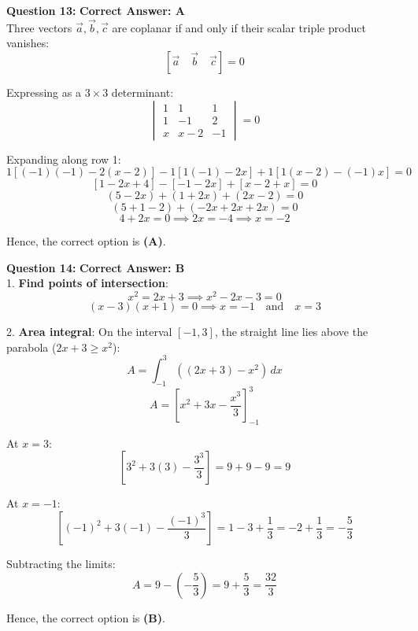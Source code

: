 \documentclass[11pt,a4paper]{article}
\begin{document}
\begin{tcolorbox}[solbox]
\textbf{\textcolor{primaryDark}{Question 13:}} \hfill \textbf{\textcolor{l1Green}{Correct Answer: A}}\\
\vspace{4pt}
Three vectors $\vec{a}, \vec{b}, \vec{c}$ are coplanar if and only if their scalar triple product vanishes:
$$[\vec{a} \quad \vec{b} \quad \vec{c}] = 0$$

Expressing as a $3 \times 3$ determinant:
$$\begin{vmatrix} 1 & 1 & 1 \\ 1 & -1 & 2 \\ x & x - 2 & -1 \end{vmatrix} = 0$$

Expanding along row 1:
$$1 [(-1)(-1) - 2(x - 2)] - 1 [1(-1) - 2x] + 1 [1(x - 2) - (-1)x] = 0$$
$$[1 - 2x + 4] - [-1 - 2x] + [x - 2 + x] = 0$$
$$(5 - 2x) + (1 + 2x) + (2x - 2) = 0$$
$$(5 + 1 - 2) + (-2x + 2x + 2x) = 0$$
$$4 + 2x = 0 \implies 2x = -4 \implies x = -2$$

Hence, the correct option is \textbf{(A)}.
\end{tcolorbox}

\begin{tcolorbox}[solbox]
\textbf{\textcolor{primaryDark}{Question 14:}} \hfill \textbf{\textcolor{l1Green}{Correct Answer: B}}\\
\vspace{4pt}
1. \textbf{Find points of intersection}:
$$x^2 = 2x + 3 \implies x^2 - 2x - 3 = 0$$
$$(x - 3)(x + 1) = 0 \implies x = -1 \quad \text{and} \quad x = 3$$

2. \textbf{Area integral}:
On the interval $[-1, 3]$, the straight line lies above the parabola ($2x + 3 \ge x^2$):
$$A = \int_{-1}^{3} \left( (2x + 3) - x^2 \right)\, dx$$
$$A = \left[ x^2 + 3x - \frac{x^3}{3} \right]_{-1}^{3}$$

At $x = 3$:
$$\left[ 3^2 + 3(3) - \frac{3^3}{3} \right] = 9 + 9 - 9 = 9$$

At $x = -1$:
$$\left[ (-1)^2 + 3(-1) - \frac{(-1)^3}{3} \right] = 1 - 3 + \frac{1}{3} = -2 + \frac{1}{3} = -\frac{5}{3}$$

Subtracting the limits:
$$A = 9 - \left(-\frac{5}{3}\right) = 9 + \frac{5}{3} = \frac{32}{3}$$

Hence, the correct option is \textbf{(B)}.
\end{tcolorbox}
\end{document}

